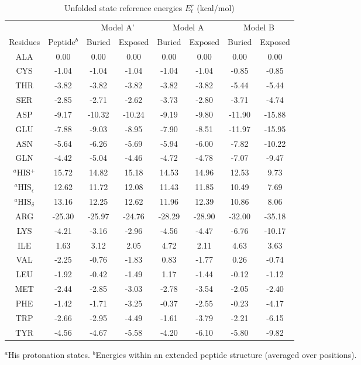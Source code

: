 \documentclass[12pt]{article}
\begin{document}
\begin{table}[h]
\caption{Unfolded state reference energies $E_t^r$ (kcal/mol)}
\label{tab:Eref}                      
\begin{center}
\small
\begin{tabular}{cccccccc} \hline \hline
    &        & \multicolumn{2}{c}{\hrulefill Model A' \hrulefill} & \multicolumn{2}{c}{\hrulefill Model A \hrulefill} &
               \multicolumn{2}{c}{\hrulefill Model B \hrulefill} \\
Residues&Peptide$^b$& Buried & Exposed & Buried & Exposed & Buried & Exposed \\ \hline
ALA     &   0.00 &   0.00 &   0.00 &   0.00 &   0.00  &   0.00 &   0.00 \\
CYS     &  -1.04 &  -1.04 &  -1.04 &  -1.04 &  -1.04  &  -0.85 &  -0.85 \\
THR     &  -3.82 &  -3.82 &  -3.82 &  -3.82 &  -3.82  &  -5.44 &  -5.44 \\
SER     &  -2.85 &  -2.71 &  -2.62 &  -3.73 &  -2.80  &  -3.71 &  -4.74 \\
ASP     &  -9.17 & -10.32 & -10.24 &  -9.19 &  -9.80  & -11.90 & -15.88 \\
GLU     &  -7.88 &  -9.03 &  -8.95 &  -7.90 &  -8.51  & -11.97 & -15.95 \\
ASN     &  -5.64 &  -6.26 &  -5.69 &  -5.94 &  -6.00  &  -7.82 & -10.22 \\
GLN     &  -4.42 &  -5.04 &  -4.46 &  -4.72 &  -4.78  &  -7.07 &  -9.47 \\
$^a$HIS$^+$ &  15.72 &  14.82 &  15.18 &  14.53 &  14.96  &  12.53 &   9.73 \\
$^a$HIS$_{\epsilon}$ &  12.62 &  11.72 &  12.08 &  11.43 &  11.85  &  10.49 & 7.69 \\
$^a$HIS$_{\delta}$ &  13.16 &  12.25 &  12.62 &  11.96 &  12.39  &  10.86 &   8.06 \\
ARG     & -25.30 & -25.97 & -24.76 & -28.29 & -28.90  & -32.00 & -35.18 \\
LYS     &  -4.21 &  -3.16 &  -2.96 &  -4.56 &  -4.47  &  -6.76 & -10.17 \\
ILE     &   1.63 &   3.12 &   2.05 &   4.72 &   2.11  &   4.63 &   3.63 \\
VAL     &  -2.25 &  -0.76 &  -1.83 &   0.83 &  -1.77  &   0.26 &  -0.74 \\
LEU     &  -1.92 &  -0.42 &  -1.49 &   1.17 &  -1.44  &  -0.12 &  -1.12 \\
MET     &  -2.44 &  -2.85 &  -3.03 &  -2.78 &  -3.54  &  -2.05 &  -2.40 \\
PHE     &  -1.42 &  -1.71 &  -3.25 &  -0.37 &  -2.55  &  -0.23 &  -4.17 \\
TRP     &  -2.66 &  -2.95 &  -4.49 &  -1.61 &  -3.79  &  -2.21 &  -6.15 \\
TYR     &  -4.56 &  -4.67 &  -5.58 &  -4.20 &  -6.10  &  -5.80 &  -9.82 \\ \hline
\end{tabular}
\end{center}
{\footnotesize \noindent $^a$His protonation states. $^b$Energies within an extended peptide structure (averaged over positions).
}
\end{table}
\end{document}
